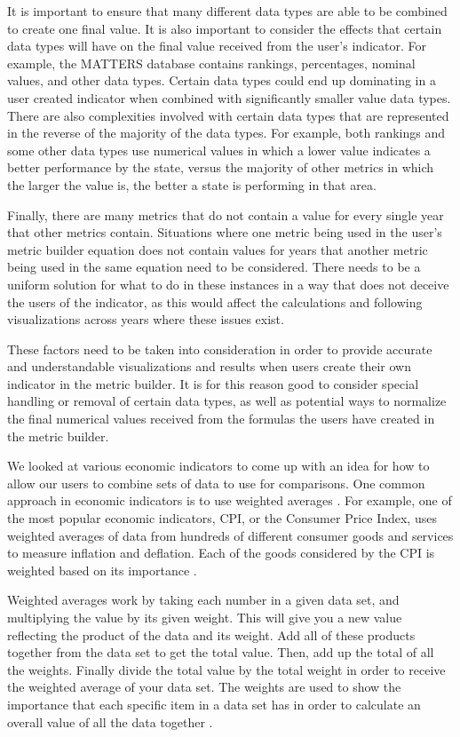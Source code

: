 		It is important to ensure that many different data types are able to be combined to create 
		one final value. It is also important to consider the effects that certain data types will 
		have on the final value received from the user’s indicator. For example, the MATTERS database 
		contains rankings, percentages, nominal values, and other data types. Certain data types could 
		end up dominating in a user created indicator when combined with significantly smaller value 
		data types. There are also complexities involved with certain data types that are represented in 
		the reverse of the majority of the data types. For example, both rankings and some other data 
		types use numerical values in which a lower value indicates a better performance by the state, 
		versus the majority of other metrics in which the larger the value is, the better a state is 
		performing in that area. 

		Finally, there are many metrics that do not contain a value for every single year that other 
		metrics contain. Situations where one metric being used in the user’s metric builder equation
		does not contain values for years that another metric being used in the same equation need to be 
		considered. There needs to be a uniform solution for what to do in these instances in a way that 
		does not deceive the users of the indicator, as this would affect the calculations and following 
		visualizations across years where these issues exist.

		These factors need to be taken into consideration in order to provide accurate and understandable 
		visualizations and results when users create their own indicator in the metric builder. It is for 
		this reason good to consider special handling or removal of certain data types, as well as potential 
		ways to normalize the final numerical values received from the formulas the users have created in 
		the metric builder.

		We looked at various economic indicators to come up with an idea for how to allow our users to 
		combine sets of data to use for comparisons. One common approach in economic indicators is to use 
		weighted averages \cite{weightedaverage}. For example, one of the most popular economic indicators, 
		CPI, or the Consumer Price Index, uses weighted averages of data from hundreds of different consumer 
		goods and services to measure inflation and deflation. Each of the goods considered by the CPI is 
		weighted based on its importance \cite{cpi}.

		Weighted averages work by taking each number in a given data set, and multiplying the value by 
		its given weight. This will give you a new value reflecting the product of the data and its weight. 
		Add all of these products together from the data set to get the total value. Then, add up the total 
		of all the weights. Finally divide the total value by the total weight in order to receive the weighted 
		average of your data set. The weights are used to show the importance that each specific item in a 
		data set has in order to calculate an overall value of all the data together \cite{economic}.
